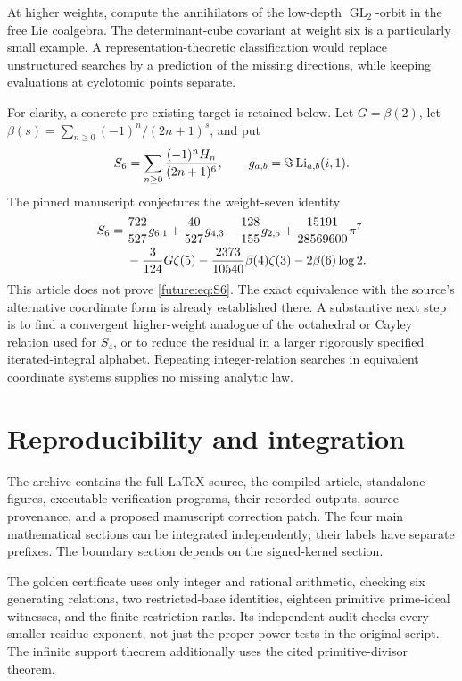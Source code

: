 At higher weights, compute the annihilators of the low-depth
\(\operatorname{GL}_2\)-orbit in the free Lie coalgebra.
The determinant-cube covariant at weight six is a particularly small
example. A representation-theoretic classification would replace
unstructured searches by a prediction of the missing directions,
while keeping evaluations at cyclotomic points separate.

For clarity, a concrete pre-existing target is retained below.
Let \(G=\beta(2)\), let
\(\beta(s)=\sum_{n\ge0}(-1)^n/(2n+1)^s\), and put
\[
 S_6=\sum_{n\ge0}\frac{(-1)^nH_n}{(2n+1)^6},
 \qquad g_{a,b}=\Im\operatorname{Li}_{a,b}(i,1).
\]
The pinned manuscript conjectures the weight-seven identity
\begin{align}
 S_6={}&\frac{722}{527}g_{6,1}
       +\frac{40}{527}g_{4,3}
       -\frac{128}{155}g_{2,5}
       +\frac{15191}{28569600}\pi^7\notag\\
      &-\frac3{124}G\zeta(5)
       -\frac{2373}{10540}\beta(4)\zeta(3)
       -2\beta(6)\log2.
 \label{future:eq:S6}
\end{align}
This article does not prove \eqref{future:eq:S6}.
The exact equivalence with the source's alternative coordinate
form is already established there. A substantive next step is to
find a convergent higher-weight analogue of the octahedral or
Cayley relation used for \(S_4\), or to reduce the residual in a
larger rigorously specified iterated-integral alphabet.
Repeating integer-relation searches in equivalent coordinate
systems supplies no missing analytic law.

\section{Reproducibility and integration}
\label{repro:sec}
The archive contains the full LaTeX source, the compiled article,
standalone figures, executable verification programs, their recorded
outputs, source provenance, and a proposed manuscript correction patch.
The four main mathematical sections can be integrated independently;
their labels have separate prefixes. The boundary section depends on
the signed-kernel section.

The golden certificate uses only integer and rational arithmetic,
checking six generating relations, two restricted-base identities,
eighteen primitive prime-ideal witnesses, and the finite restriction
ranks. Its independent audit checks every smaller residue exponent,
not just the proper-power tests in the original script. The infinite
support theorem additionally uses the cited primitive-divisor theorem.

